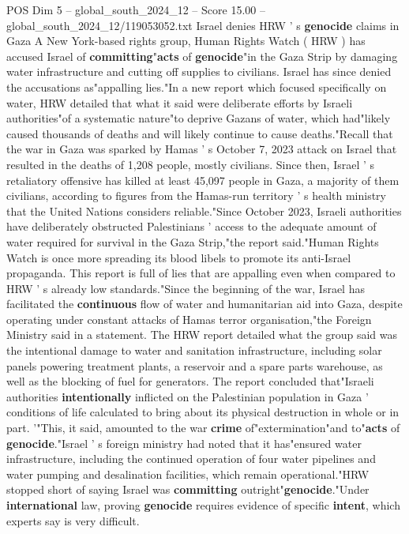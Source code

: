 \begin{textsample}{POS Dim 5 – global\_south\_2024\_12 – Score 15.00 – global\_south\_2024\_12/119053052.txt}  \label{ex:f5_pos_050}
Israel denies HRW ' s \textbf{genocide} claims in Gaza A New York-based rights group, Human Rights Watch ( HRW ) has accused Israel of \textbf{committing}"\textbf{acts} of \textbf{genocide}"in the Gaza Strip by damaging water infrastructure and cutting off supplies to civilians.
Israel has since denied the accusations as"appalling lies."In a new report which focused specifically on water, HRW detailed that what it said were deliberate efforts by Israeli authorities"of a systematic nature"to deprive Gazans of water, which had"likely caused thousands of deaths and will likely continue to cause deaths."Recall that the war in Gaza was sparked by Hamas ' s October 7, 2023 attack on Israel that resulted in the deaths of 1,208 people, mostly civilians.
Since then, Israel ' s retaliatory offensive has killed at least 45,097 people in Gaza, a majority of them civilians, according to figures from the Hamas-run territory ' s health ministry that the United Nations considers reliable."Since October 2023, Israeli authorities have deliberately obstructed Palestinians ' access to the adequate amount of water required for survival in the Gaza Strip,"the report said."Human Rights Watch is once more spreading its blood libels to promote its anti-Israel propaganda.
This report is full of lies that are appalling even when compared to HRW ' s already low standards."Since the beginning of the war, Israel has facilitated the \textbf{continuous} flow of water and humanitarian aid into Gaza, despite operating under constant attacks of Hamas terror organisation,"the Foreign Ministry said in a statement.
The HRW report detailed what the group said was the intentional damage to water and sanitation infrastructure, including solar panels powering treatment plants, a reservoir and a spare parts warehouse, as well as the blocking of fuel for generators.
The report concluded that"Israeli authorities \textbf{intentionally} inflicted on the Palestinian population in Gaza ' conditions of life calculated to bring about its physical destruction in whole or in part. '"This, it said, amounted to the war \textbf{crime} of"extermination"and to"\textbf{acts} of \textbf{genocide}."Israel ' s foreign ministry had noted that it has"ensured water infrastructure, including the continued operation of four water pipelines and water pumping and desalination facilities, which remain operational."HRW stopped short of saying Israel was \textbf{committing} outright"\textbf{genocide}."Under \textbf{international} law, proving \textbf{genocide} requires evidence of specific \textbf{intent}, which experts say is very difficult.

\end{textsample}
